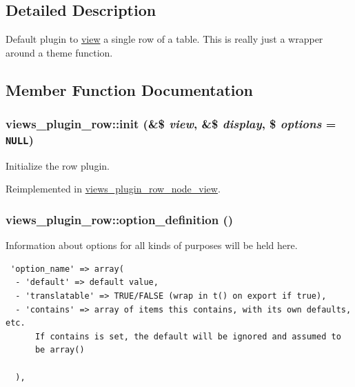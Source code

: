 \subsection{Detailed Description}
Default plugin to \hyperlink{classview}{view} a single row of a table. This is really just a wrapper around a theme function. 

\subsection{Member Function Documentation}
\hypertarget{classviews__plugin__row_bf02e5f51e907c5009edda15d997c161}{
\subsubsection[{init}]{\setlength{\rightskip}{0pt plus 5cm}views\_\-plugin\_\-row::init (\&\$ {\em view}, \/  \&\$ {\em display}, \/  \$ {\em options} = {\tt NULL})}}
\label{classviews__plugin__row_bf02e5f51e907c5009edda15d997c161}


Initialize the row plugin. 

Reimplemented in \hyperlink{classviews__plugin__row__node__view_3bb6fb204cefdab520d24765a8f916ba}{views\_\-plugin\_\-row\_\-node\_\-view}.\hypertarget{classviews__plugin__row_ad6be1492eae8605e9aff37da9f19337}{
\subsubsection[{option\_\-definition}]{\setlength{\rightskip}{0pt plus 5cm}views\_\-plugin\_\-row::option\_\-definition ()}}
\label{classviews__plugin__row_ad6be1492eae8605e9aff37da9f19337}


Information about options for all kinds of purposes will be held here. 

\begin{Code}\begin{verbatim} 'option_name' => array(
  - 'default' => default value,
  - 'translatable' => TRUE/FALSE (wrap in t() on export if true),
  - 'contains' => array of items this contains, with its own defaults, etc.
      If contains is set, the default will be ignored and assumed to
      be array()

  ),
\end{verbatim}
\end{Code}

